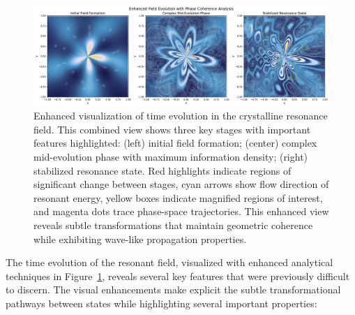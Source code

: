 \documentclass[12pt,letterpaper]{article}
\begin{document}
\begin{figure}[H]
    \centering
    \includegraphics[width=\textwidth]{figures_enhanced_20250503_161506/field_evolution_combined_enhanced.pdf}
    \caption{Enhanced visualization of time evolution in the crystalline resonance field. This combined view shows three key stages with important features highlighted: (left) initial field formation; (center) complex mid-evolution phase with maximum information density; (right) stabilized resonance state. Red highlights indicate regions of significant change between stages, cyan arrows show flow direction of resonant energy, yellow boxes indicate magnified regions of interest, and magenta dots trace phase-space trajectories. This enhanced view reveals subtle transformations that maintain geometric coherence while exhibiting wave-like propagation properties.}
    \label{fig:field_evolution}
\end{figure}

\begin{figure}[H]
\end{figure}

The time evolution of the resonant field, visualized with enhanced analytical techniques in Figure~\ref{fig:field_evolution}, reveals several key features that were previously difficult to discern. The visual enhancements make explicit the subtle transformational pathways between states while highlighting several important properties:
\end{document}
